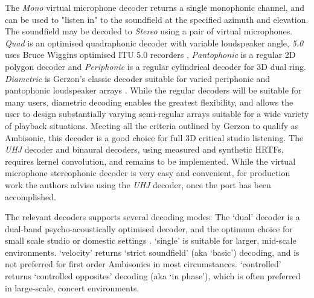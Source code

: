 \documentclass{article}
\begin{document}
The \emph{Mono} virtual microphone decoder returns a single monophonic channel, and can be used to "listen in" to the soundfield at the specified azimuth and elevation.
The soundfield may be decoded to \emph{Stereo} using a pair of virtual microphones.
\emph{Quad} is an optimised quadraphonic decoder with variable loudspeaker angle, \emph{5.0} uses Bruce Wiggins optimised ITU 5.0 recorders \cite{wiggins:2003optimised}, \emph{Pantophonic} is a regular 2D polygon decoder and \emph{Periphonic} is a regular cylindrical decoder for 3D dual ring.
\emph{Diametric} is Gerzon's classic decoder suitable for varied periphonic and pantophonic loudspeaker arrays \cite{gerzon:1980sphere}.
While the regular decoders will be suitable for many users, diametric decoding enables the greatest flexibility, and allows the user to design substantially varying semi-regular arrays suitable for a wide variety of playback situations.
Meeting all the criteria outlined by Gerzon to qualify as Ambisonic, this decoder is a good choice for full 3D critical studio listening.
The \emph{UHJ} decoder and binaural decoders, using measured and synthetic HRTFs, requires kernel convolution, and remains to be implemented.
While the virtual microphone stereophonic decoder is very easy and convenient, for production work the authors advise using the \emph{UHJ} decoder, once the port has been accomplished.

The relevant decoders supports several decoding modes: 
The `dual' decoder is a dual-band psycho-acoustically optimised decoder, and the optimum choice for small scale studio or domestic settings \cite{heller:2008isAmbisonic}.
`single' is suitable for larger, mid-scale environments.
`velocity' returns `strict soundfield' (aka `basic') decoding, and is not preferred for first order Ambisonics in most circumstances.
`controlled' returns `controlled opposites' decoding (aka `in phase'), which is often preferred in large-scale, concert environments.



\end{document}
